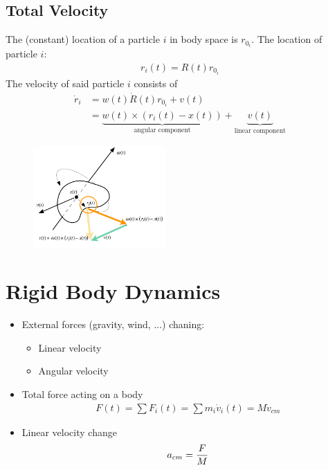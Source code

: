 \begin{multicols}{2}
\subsection{Total Velocity}
The (constant) location of a particle $i$ in body space is $r_{0_i}$. The location of particle $i$:
\begin{align*}
	r_i(t) = R(t)r_{0_i}
\end{align*}
The velocity of said particle $i$ consists of 
\begin{align*}
\dot r_i &= w(t) \dot R(t) r_{0_i} + v(t)\\
 &= \underbrace{w(t) \times (r_i(t) - x(t))}_\text{angular component} + \underbrace{v(t)}_\text{linear component}
\end{align*}
\begin{figure}[H]
	\centering
	\includegraphics[width=0.45\textwidth]{img/04_total_velocity}
\end{figure}

\section{Rigid Body Dynamics}
\begin{itemize}
	\item External forces (gravity, wind, ...) chaning:
		\begin{itemize}
			\item Linear velocity
			\item Angular velocity
		\end{itemize}
	\item Total force acting on a body
		\begin{align*}
			F(t) = \sum F_i(t) = \sum m_i \dot v_i(t) = M \dot v_{cm}
		\end{align*}
	\item Linear velocity change
		\begin{align*}
			a_{cm} = {F \over M}
		\end{align*}
\end{itemize}



\end{multicols}
